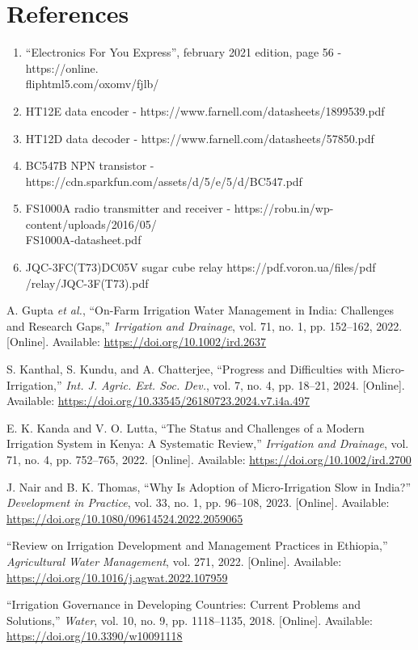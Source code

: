 \newpage
{}
\chapter*{References}
\begin{enumerate}
  \item “Electronics For You Express”, february 2021 edition, page 56
    - https://online.\\fliphtml5.com/oxomv/fjlb/
  \item HT12E data encoder - https://www.farnell.com/datasheets/1899539.pdf
  \item HT12D data decoder - https://www.farnell.com/datasheets/57850.pdf
  \item BC547B NPN transistor -
    https://cdn.sparkfun.com/assets/d/5/e/5/d/BC547.pdf
  \item FS1000A radio transmitter and receiver -
    https://robu.in/wp-content/uploads/2016/05/\\FS1000A-datasheet.pdf
  \item JQC-3FC(T73)DC05V sugar cube relay
    https://pdf.voron.ua/files/pdf\\/relay/JQC-3F(T73).pdf
\end{enumerate}

\renewcommand{\bibname}{References}
\begin{thebibliography}{9}

  A. Gupta \textit{et al.}, “On-Farm Irrigation Water Management in India: Challenges and Research Gaps,” \textit{Irrigation and Drainage}, vol. 71, no. 1, pp. 152–162, 2022. [Online]. Available: \url{https://doi.org/10.1002/ird.2637}

  S. Kanthal, S. Kundu, and A. Chatterjee, “Progress and Difficulties with Micro-Irrigation,” \textit{Int. J. Agric. Ext. Soc. Dev.}, vol. 7, no. 4, pp. 18–21, 2024. [Online]. Available: \url{https://doi.org/10.33545/26180723.2024.v7.i4a.497}

  E. K. Kanda and V. O. Lutta, “The Status and Challenges of a Modern Irrigation System in Kenya: A Systematic Review,” \textit{Irrigation and Drainage}, vol. 71, no. 4, pp. 752–765, 2022. [Online]. Available: \url{https://doi.org/10.1002/ird.2700}

  J. Nair and B. K. Thomas, “Why Is Adoption of Micro-Irrigation Slow in India?” \textit{Development in Practice}, vol. 33, no. 1, pp. 96–108, 2023. [Online]. Available: \url{https://doi.org/10.1080/09614524.2022.2059065}

  “Review on Irrigation Development and Management Practices in Ethiopia,” \textit{Agricultural Water Management}, vol. 271, 2022. [Online]. Available: \url{https://doi.org/10.1016/j.agwat.2022.107959}

  “Irrigation Governance in Developing Countries: Current Problems and Solutions,” \textit{Water}, vol. 10, no. 9, pp. 1118–1135, 2018. [Online]. Available: \url{https://doi.org/10.3390/w10091118}

\end{thebibliography}
